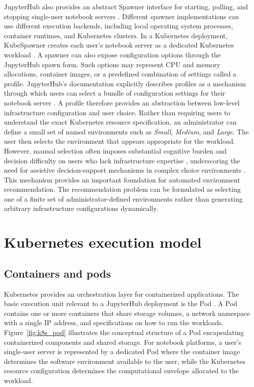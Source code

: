 JupyterHub also provides an abstract Spawner interface for starting, polling, and stopping single-user notebook servers \cite{jupyterhub-spawners}. Different spawner implementations can use different execution backends, including local operating system processes, container runtimes, and Kubernetes clusters. In a Kubernetes deployment, KubeSpawner creates each user's notebook server as a dedicated Kubernetes workload \cite{kspawner,z2jh}. A spawner can also expose configuration options through the JupyterHub spawn form. Such options may represent CPU and memory allocations, container images, or a predefined combination of settings called a profile. JupyterHub's documentation explicitly describes profiles as a mechanism through which users can select a bundle of configuration settings for their notebook server \cite{jupyterhub-spawners}. A profile therefore provides an abstraction between low-level infrastructure configuration and user choice. Rather than requiring users to understand the exact Kubernetes resource specification, an administrator can define a small set of named environments such as \emph{Small}, \emph{Medium}, and \emph{Large}. The user then selects the environment that appears appropriate for the workload. However, manual selection often imposes substantial cognitive burden and decision difficulty on users who lack infrastructure expertise \cite{jameson}, underscoring the need for assistive decision-support mechanisms in complex choice environments \cite{parasuraman}. This mechanism provides an important foundation for automated environment recommendation. The recommendation problem can be formulated as selecting one of a finite set of administrator-defined environments rather than generating arbitrary infrastructure configurations dynamically.

\section{Kubernetes execution model}

\subsection{Containers and pods}

Kubernetes provides an orchestration layer for containerized applications. The basic execution unit relevant to a JupyterHub deployment is the Pod \cite{k8sresources}. A Pod contains one or more containers that share storage volumes, a network namespace with a single IP address, and specifications on how to run the workloads. Figure~\ref{fig:k8s_pod} illustrates the conceptual structure of a Pod encapsulating containerized components and shared storage. For notebook platforms, a user's single-user server is represented by a dedicated Pod where the container image determines the software environment available to the user, while the Kubernetes resource configuration determines the computational envelope allocated to the workload.

